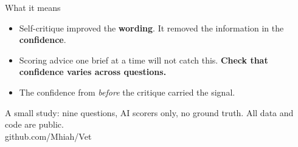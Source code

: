 \documentclass[aspectratio=169,12pt]{beamer}
\newcommand{\sm}[1]{{\small\color{muted}#1}}
\begin{document}
\begin{frame}{What it means}
\begin{itemize}\setlength{\itemsep}{9pt}
\item Self-critique improved the \textbf{wording}. It removed the information in the \textbf{confidence}.
\item Scoring advice one brief at a time will not catch this. \textbf{Check that confidence varies across questions.}
\item The confidence from \emph{before} the critique carried the signal.
\end{itemize}
\vspace{0.25cm}
\sm{A small study: nine questions, AI scorers only, no ground truth. All data and code are public.\\ github.com/Mhiah/Vet}
\end{frame}
\end{document}
